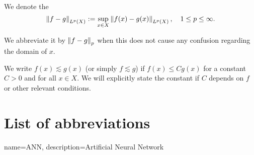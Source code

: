 We denote the 
\begin{equation*}
    \left\| f - g \right\|_{L^{p}(X)} := 
    \sup_{x \in X} \left\| f(x) - g(x) \right\|_{L^{p}(X)}, \quad 1 \leq p \leq \infty.
\end{equation*}

We abbreviate it by $\left\| f - g \right\|_{p}$ when this does not cause any confusion
regarding the domain of $x$.

We write $f(x) \lesssim g(x)$ (or simply $f \lesssim g$) if $f(x) \leq C g(x)$ for
a constant $C>0$ and for all $x \in X$. We will explicitly state the constant if
$C$ depends on $f$ or other relevant conditions.

\section*{List of abbreviations}

\printglossary

{
    name=ANN,
    description={Artificial Neural Network}
}





